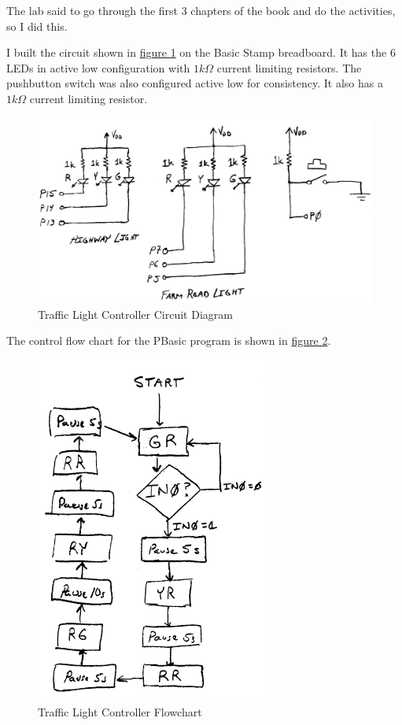 \documentclass[11pt]{article}
\begin{document}
The lab said to go through the first 3 chapters of the book and do the activities, so I did this.

I built the circuit shown in \hyperref[traffic-light-circuit]{figure \ref{traffic-light-circuit}} on the Basic Stamp breadboard.
It has the 6 LEDs in active low configuration with $1k\Omega$ current limiting resistors.
The pushbutton switch was also configured active low for consistency.
It also has a $1k\Omega$ current limiting resistor.

\begin{figure}[h!]
\centering
\includegraphics[width=.7\textwidth]{traffic-light-circuit.pdf}
\caption{Traffic Light Controller Circuit Diagram}
\label{traffic-light-circuit}
\end{figure}

The control flow chart for the PBasic program is shown in \hyperref[traffic-light-flowchart]{figure \ref{traffic-light-flowchart}}.

\begin{figure}[ht]
\centering
\includegraphics[width=0.7\textwidth]{traffic-light-flowchart.pdf}
\caption{Traffic Light Controller Flowchart}
\label{traffic-light-flowchart}
\end{figure}
\end{document}
